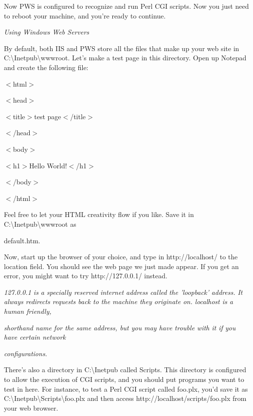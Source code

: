 \documentclass[a4paper,11pt]{book}
\begin{document}
\noindent 

\noindent Now PWS is configured to recognize and run Perl CGI scripts. Now you just need to reboot your machine, and you're ready to continue.

\noindent 

\noindent \textit{Using Windows Web Servers}

\noindent By default, both IIS and PWS store all the files that make up your web site in C:\textbackslash Inetpub\textbackslash wwwroot. Let's make a test page in this directory. Open up Notepad and create the following file:

\noindent 

\noindent $<$html$>$

\noindent $<$head$>$

\noindent $<$title$>$test page$<$/title$>$

\noindent $<$/head$>$

\noindent $<$body$>$

\noindent $<$h1$>$Hello World!$<$/h1$>$

\noindent $<$/body$>$

\noindent $<$/html$>$

\noindent 

\noindent Feel free to let your HTML creativity flow if you like. Save it in C:\textbackslash Inetpub\textbackslash wwwroot as

\noindent default.htm.

\noindent 

\noindent Now,  start up the browser of  your  choice,  and  type  in  http://localhost/ to  the location  field.  You should see the web  page we just  made  appear.  If  you  get  an  error,  you  might  want  to  try http://127.0.0.1/ instead.

\noindent 

\noindent \textit{127.0.0.1 is a specially reserved internet address called the 'loopback' address. It always redirects requests back to the machine they originate on. localhost is a human friendly,}

\noindent \textit{shorthand name for the same address, but you may have trouble with it if you have certain network}

\noindent \textit{configurations.}

\noindent 

\noindent There's also a directory in C:\textbackslash Inetpub called Scripts. This directory is configured to allow the execution of CGI scripts, and you should put programs you want to test in here. For instance, to test a Perl CGI script called foo.plx, you'd save it as C:\textbackslash Inetpub\textbackslash Scripts\textbackslash foo.plx and then access http://localhost/scripts/foo.plx from your web browser.
\end{document}
